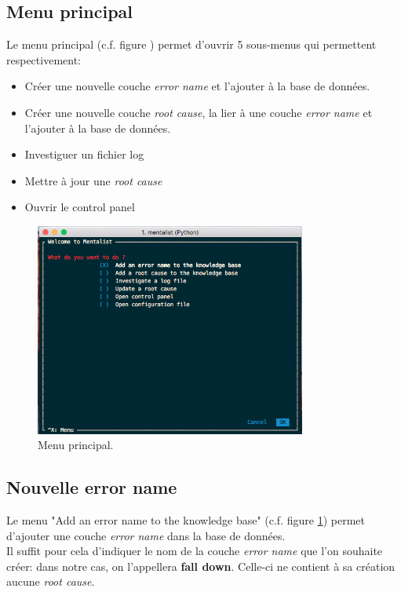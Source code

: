 \subsection{Menu principal}
\label{Industrialisation du produit: Utilisation suggérée des outils: Menu principal}
Le menu principal (c.f. figure ) permet d'ouvrir 5 sous-menus qui permettent respectivement:
\begin{itemize}
	\item Créer une nouvelle couche \emph{error name} et l'ajouter à la base de données.
	\item Créer une nouvelle couche \emph{root cause}, la lier à une couche \emph{error name} et l'ajouter à la base de données.
	\item Investiguer un fichier log
	\item Mettre à jour une \emph{root cause}
	\item Ouvrir le control panel
\end{itemize}

\begin{figure}[H]
	\centering\includegraphics[height=7cm]{images/main_menu.png}
	\caption[Menu principal]{Menu principal.}
	\label{fig:Menu principal}
\end{figure} 

\subsection{Nouvelle error name}
\label{Industrialisation du produit: Utilisation suggérée des outils: Nouvelle error name}
Le menu "Add an error name to the knowledge base" (c.f. figure 	\ref{fig:Menu principal}) permet d'ajouter une couche \emph{error name} dans la base de données. \\
Il suffit pour cela d'indiquer le nom de la couche \emph{error name} que l'on souhaite créer: dans notre cas, on l'appellera \textbf{fall down}. Celle-ci ne contient à sa création aucune \emph{root cause}.

